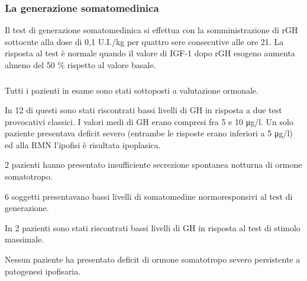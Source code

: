 \subsubsection*{La generazione somatomedinica}
Il test di generazione somatomedinica si effettua con la somministrazione di rGH sottocute alla dose di 0,1 U.I./kg per quattro sere consecutive alle ore 21. La risposta al test è normale quando il valore di IGF-1 dopo rGH esogeno aumenta almeno del 50 \%
rispetto al valore basale.

\subsubsection*{}
Tutti i pazienti in esame sono stati sottoposti a valutazione ormonale. 

In 12 di questi sono stati riscontrati bassi livelli di GH in risposta a due test provocativi classici. I valori medi di GH erano compresi fra 5 e 10 \unit{\micro g}/l. Un solo paziente presentava deficit severo (entrambe le risposte erano inferiori a 5 \unit{\micro g}/l) ed alla RMN l'ipofisi è risultata ipoplasica.

2 pazienti hanno presentato insufficiente secrezione spontanea notturna di ormone somatotropo.

6 soggetti presentavano bassi livelli di somatomedine normoresponsivi al test di generazione.


In 2 pazienti sono stati riscontrati bassi livelli di GH in risposta al test di stimolo massimale.

Nessun paziente ha presentato deficit di ormone somatotropo severo persistente a patogenesi ipofisaria. 
